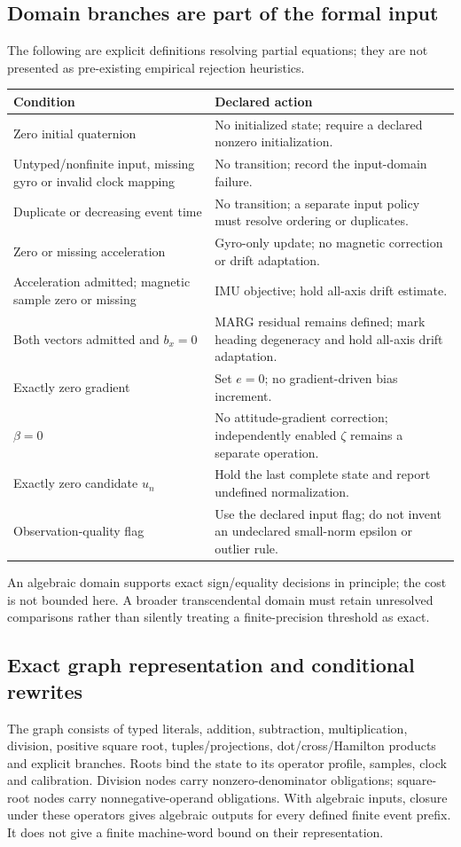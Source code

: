 \subsection{Domain branches are part of the formal input}
The following are explicit definitions resolving partial equations; they are
not presented as pre-existing empirical rejection heuristics.
\begin{center}\begin{tabularx}{\linewidth}{@{}p{.34\linewidth}X@{}}\toprule
Condition & Declared action\\\midrule
Zero initial quaternion & No initialized state; require a declared nonzero initialization.\\
Untyped/nonfinite input, missing gyro or invalid clock mapping & No transition; record the input-domain failure.\\
Duplicate or decreasing event time & No transition; a separate input policy must resolve ordering or duplicates.\\
Zero or missing acceleration & Gyro-only update; no magnetic correction or drift adaptation.\\
Acceleration admitted; magnetic sample zero or missing & IMU objective; hold all-axis drift estimate.\\
Both vectors admitted and $b_x=0$ & MARG residual remains defined; mark heading degeneracy and hold all-axis drift adaptation.\\
Exactly zero gradient & Set $e=0$; no gradient-driven bias increment.\\
$\beta=0$ & No attitude-gradient correction; independently enabled $\zeta$ remains a separate operation.\\
Exactly zero candidate $u_n$ & Hold the last complete state and report undefined normalization.\\
Observation-quality flag & Use the declared input flag; do not invent an undeclared small-norm epsilon or outlier rule.\\\bottomrule
\end{tabularx}\end{center}
An algebraic domain supports exact sign/equality decisions in principle; the cost
is not bounded here. A broader transcendental domain must retain unresolved
comparisons rather than silently treating a finite-precision threshold as exact.

\subsection{Exact graph representation and conditional rewrites}
The graph consists of typed literals, addition, subtraction, multiplication,
division, positive square root, tuples/projections, dot/cross/Hamilton products
and explicit branches. Roots bind the state to its operator profile, samples,
clock and calibration. Division nodes carry nonzero-denominator obligations;
square-root nodes carry nonnegative-operand obligations. With algebraic inputs,
closure under these operators gives algebraic outputs for every defined finite
event prefix. It does not give a finite machine-word bound on their representation.

